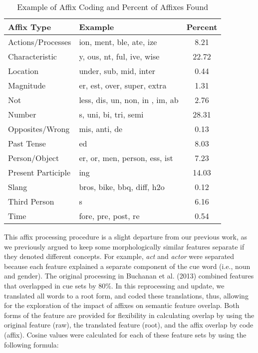 \documentclass[english,,man]{apa6}
\theoremstyle{definition}
\theoremstyle{definition}
\theoremstyle{definition}
\theoremstyle{remark}
\begin{document}
\begin{table}[tbp]
\begin{center}
\begin{threeparttable}
\caption{\label{tab:affix-table}Example of Affix Coding and Percent of Affixes Found}
\begin{tabular}{llc}
\toprule
Affix Type & Example & Percent\\
\midrule
Actions/Processes & ion, ment, ble, ate, ize & 8.21\\
Characteristic & y, ous, nt, ful, ive, wise & 22.72\\
Location & under, sub, mid, inter & 0.44\\
Magnitude & er, est, over, super, extra & 1.31\\
Not & less, dis, un, non, in , im, ab & 2.76\\
Number & s, uni, bi, tri, semi & 28.31\\
Opposites/Wrong & mis, anti, de & 0.13\\
Past Tense & ed & 8.03\\
Person/Object & er, or, men, person, ess, ist & 7.23\\
Present Participle & ing & 14.03\\
Slang & bros, bike, bbq, diff, h2o & 0.12\\
Third Person & s & 6.16\\
Time & fore, pre, post, re & 0.54\\
\bottomrule
\end{tabular}
\end{threeparttable}
\end{center}
\end{table}

This affix processing procedure is a slight departure from our previous
work, as we previously argued to keep some morphologically similar
features separate if they denoted different concepts. For example,
\emph{act} and \emph{actor} were separated because each feature
explained a separate component of the cue word (i.e., noun and gender).
The original processing in Buchanan et al. (2013) combined features that
overlapped in cue sets by 80\%. In this reprocessing and update, we
translated all words to a root form, and coded these translations, thus,
allowing for the exploration of the impact of affixes on semantic
feature overlap. Both forms of the feature are provided for flexibility
in calculating overlap by using the original feature (raw), the
translated feature (root), and the affix overlap by code (affix). Cosine
values were calculated for each of these feature sets by using the
following formula:
\end{document}
